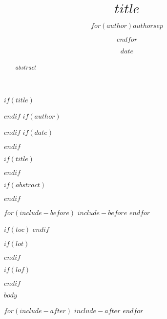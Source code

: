 \documentclass[$if(fontsize)$$fontsize$,$endif$$if(papersize)$$papersize$,$endif$$for(classoption)$$classoption$$sep$,$endfor$]{$documentclass$}
\begin{document}
$if(title)$
\title{$title$}
$endif$
$if(author)$
\author{$for(author)$$author$$sep$ \and $endfor$}
$endif$
$if(date)$
\date{$date$}
$endif$

$if(title)$
\maketitle
$endif$

$if(abstract)$
\begin{abstract}
$abstract$
\end{abstract}
$endif$

$for(include-before)$
$include-before$
$endfor$

$if(toc)$
\tableofcontents
$endif$

$if(lot)$
\listoftables
$endif$

$if(lof)$
\listoffigures
$endif$

$body$

$for(include-after)$
$include-after$
$endfor$
\end{document}
